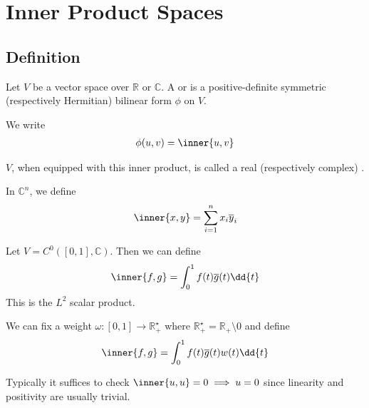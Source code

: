 \section{Inner Product Spaces}

\subsection{Definition}
\begin{definition}
	Let $V$ be a vector space over $\mathbb R$ or $\mathbb C$.
	A  or  is a positive-definite symmetric (respectively Hermitian) bilinear form $\phi$ on $V$.
\end{definition}

\begin{notation}
	We write
	\begin{align*}
		\phi(u,v) = \inner{u,v}
	\end{align*}
\end{notation} 

\begin{definition}
	$V$, when equipped with this inner product, is called a real (respectively complex) .
\end{definition} 

\begin{example}
	In $\mathbb C^n$, we define
	\begin{align*}
		\inner{x,y} = \sum_{i=1}^n x_i \overline y_i
	\end{align*}
\end{example}

\begin{example}
	Let $V = C^0([0,1], \mathbb C)$.
	Then we can define
	\begin{align*}
		\inner{f,g} = \int_0^1 f(t) \overline g(t) \dd{t}
	\end{align*}
	This is the $L^2$ scalar product.
\end{example}

\begin{example}
	We can fix a weight $\omega \colon [0,1] \to \mathbb R^\star_+$ where $\mathbb R^\star_+ = \mathbb R_+ \setminus \qty{0}$ and define
	\begin{align*}
		\inner{f,g} = \int_0^1 f(t) \overline g(t) w(t) \dd{t}
	\end{align*}
\end{example}

\begin{remark}
	Typically it suffices to check $\inner{u,u} = 0 \implies u = 0$ since linearity and positivity are usually trivial.
\end{remark}

